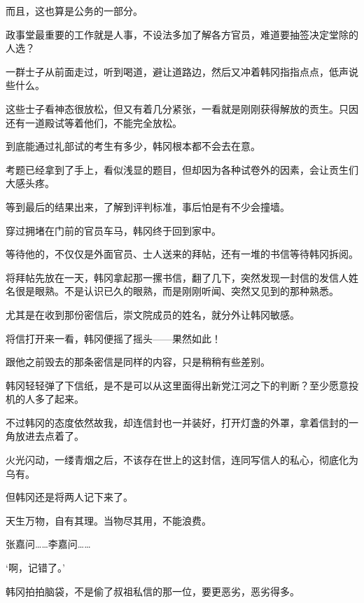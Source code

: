 而且，这也算是公务的一部分。

政事堂最重要的工作就是人事，不设法多加了解各方官员，难道要抽签决定堂除的人选？

一群士子从前面走过，听到喝道，避让道路边，然后又冲着韩冈指指点点，低声说些什么。

这些士子看神态很放松，但又有着几分紧张，一看就是刚刚获得解放的贡生。只因还有一道殿试等着他们，不能完全放松。

到底能通过礼部试的考生有多少，韩冈根本都不会去在意。

考题已经拿到了手上，看似浅显的题目，但却因为各种试卷外的因素，会让贡生们大感头疼。

等到最后的结果出来，了解到评判标准，事后怕是有不少会撞墙。

穿过拥堵在门前的官员车马，韩冈终于回到家中。

等待他的，不仅仅是外面官员、士人送来的拜帖，还有一堆的书信等待韩冈拆阅。

将拜帖先放在一天，韩冈拿起那一摞书信，翻了几下，突然发现一封信的发信人姓名很是眼熟。不是认识已久的眼熟，而是刚刚听闻、突然又见到的那种熟悉。

尤其是在收到那份密信后，崇文院成员的姓名，就分外让韩冈敏感。

将信打开来一看，韩冈便摇了摇头——果然如此！

跟他之前毁去的那条密信是同样的内容，只是稍稍有些差别。

韩冈轻轻弹了下信纸，是不是可以从这里面得出新党江河之下的判断？至少愿意投机的人多了起来。

不过韩冈的态度依然故我，却连信封也一并装好，打开灯盏的外罩，拿着信封的一角放进去点着了。

火光闪动，一缕青烟之后，不该存在世上的这封信，连同写信人的私心，彻底化为乌有。

但韩冈还是将两人记下来了。

天生万物，自有其理。当物尽其用，不能浪费。

张嘉问……李嘉问……

‘啊，记错了。’

韩冈拍拍脑袋，不是偷了叔祖私信的那一位，要更恶劣，恶劣得多。
